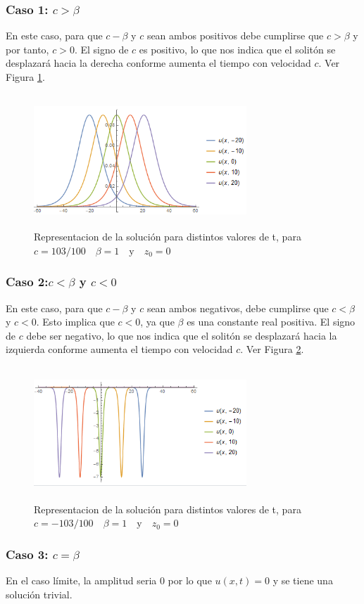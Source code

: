 \subsubsection{Caso 1: $c>\beta$}

En este caso, para que $c-\beta$ y $c$ sean ambos positivos debe cumplirse que $c>\beta$ y por tanto, $c>0$. El signo de $c$ es positivo, lo que nos indica que el solitón se desplazará hacia la derecha conforme aumenta el tiempo con velocidad $c$. Ver Figura \ref{fig:despdch}.

\begin{figure}[h]
  \centering
    \includegraphics[width=8cm, height=5cm]{graf dcha.png}
  \caption{Representacion de la solución para distintos valores de t, para $c=103/100 \quad \beta=1 \quad \mbox{y} \quad z_{0} = 0$}
  \label{fig:despdch}
\end{figure}

\subsubsection{Caso 2:$c<\beta$ y $c<0$}

En este caso, para que $c-\beta$ y $c$ sean ambos negativos, debe cumplirse que $c<\beta$ y $c<0$. Esto implica que $c<0$, ya que $\beta$ es una constante real positiva. El signo de $c$ debe ser negativo, lo que nos indica que el solitón se desplazará hacia la izquierda conforme aumenta el tiempo con velocidad $c$. Ver Figura \ref{fig:despizq}.

\begin{figure}[h]
  \centering
    \includegraphics[width=8cm, height=5cm]{graf izq.png}
  \caption{Representacion de la solución para distintos valores de t, para $c=-103/100 \quad \beta=1 \quad \mbox{y} \quad z_{0} = 0$}
  \label{fig:despizq}
\end{figure}

\subsubsection{Caso 3: $c=\beta$}

En el caso límite, la amplitud seria $0$ por lo que $u(x,t)=0$ y se tiene una solución trivial.

